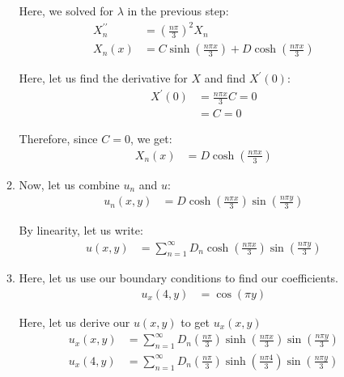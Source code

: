 \documentclass{article}
\begin{document}
\begin{enumerate}
\begin{enumerate}
    Here, we solved for $\lambda$ in the previous step:
    \begin{align}
      X^{\prime\prime}_n & =
      \left(
      \frac{n \pi}{3}
      \right)^2
      X_n
      \\
      X_n(x) & =
      C
      \sinh \left(
      \frac{n \pi x}{3}
      \right) +
      D \cosh \left(
      \frac{n \pi x}{3}
      \right)
    \end{align}

    Here, let us find the derivative for $X$ and find $X^\prime(0)$:
    \begin{align}
      X^\prime(0) & = \frac{n \pi x}{3} C = 0\\
      & = C = 0
    \end{align}

    Therefore, since $C = 0$, we get:
    \begin{align}
      X_n(x) & = D \cosh\left( \frac{n \pi x}{3} \right)
    \end{align}
    \item Now, let us combine $u_n$ and $u$:
    \begin{align}
      u_n(x, y) & =
      D \cosh\left( \frac{n \pi x}{3} \right) \sin\left( \frac{n \pi y}{3} \right)
    \end{align}

    By linearity, let us write:
    \begin{align}
      u(x, y) & =
      \sum^\infty_{n = 1}
      D_n
      \cosh\left( \frac{n \pi x}{3} \right)
      \sin\left( \frac{n \pi y}{3} \right)
    \end{align}

    \item Here, let us use our boundary conditions to find our coefficients.
    \begin{align}
      u_x(4, y) & = \cos( \pi y)
    \end{align}

    Here, let us derive our $u(x, y)$ to get $u_x(x, y)$
    \begin{align}
      u_x(x, y) & =
      \sum^\infty_{n = 1} D_n
      \left( \frac{n \pi}{3} \right)
      \sinh\left( \frac{n \pi x}{3} \right)
      \sin\left( \frac{n \pi y}{3} \right)\\
      u_x(4, y) & =
      \sum^\infty_{n = 1} D_n
      \left( \frac{n \pi}{3} \right)
      \sinh\left( \frac{n \pi 4}{3} \right)
      \sin\left( \frac{n \pi y}{3} \right)
    \end{align}


\end{enumerate}
\end{enumerate}
\end{document}
